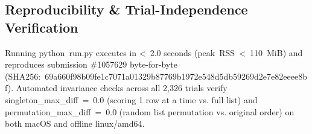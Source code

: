 \documentclass[10pt,letterpaper]{article}
\begin{document}
\subsection*{Reproducibility \& Trial-Independence Verification}\label{reproducibility-trial-independence-verification}

Running \textnormal{python\ run.py} executes in \textnormal{\textless{}\ 2.0} seconds (\textnormal{peak\ RSS\ \textless{}\ 110\ MiB}) and reproduces submission \textnormal{\#1057629} byte-for-byte (\textnormal{SHA256:\ 69a660f9\allowbreak{}8b09fe1c\allowbreak{}7071a013\allowbreak{}29b87769\allowbreak{}b1972e54\allowbreak{}8d5db592\allowbreak{}69d2e7e8\allowbreak{}2eeee8bf}). Automated invariance checks across all 2,326 trials verify \textnormal{singleton\_\allowbreak{}max\_\allowbreak{}diff\ =\ 0.0} (scoring 1 row at a time vs. full list) and \textnormal{permutation\_\allowbreak{}max\_\allowbreak{}diff\ =\ 0.0} (random list permutation vs. original order) on both macOS and offline \textnormal{linux/amd64}.
\end{document}
